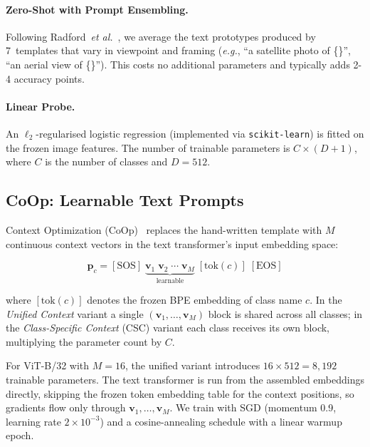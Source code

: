 \documentclass[10pt,twocolumn,letterpaper]{article}
\newcommand{\eg}{\emph{e.g.}}
\newcommand{\etal}{\emph{et al.}}
\begin{document}
\paragraph{Zero-Shot with Prompt Ensembling.}
Following Radford~\etal~\cite{radford2021learning}, we average the text prototypes produced by 7~templates that vary in viewpoint and framing (\eg, ``a satellite photo of \{\}'', ``an aerial view of \{\}''). This costs no additional parameters and typically adds 2-4 accuracy points.

\paragraph{Linear Probe.}
An $\ell_2$-regularised logistic regression (implemented via \texttt{scikit-learn}) is fitted on the frozen image features.  The number of trainable parameters is $C \times (D + 1)$, where $C$ is the number of classes and $D = 512$.


\subsection{CoOp: Learnable Text Prompts}\label{sec:coop}

Context Optimization (CoOp)~\cite{zhou2022learning} replaces the hand-written template with $M$ continuous context vectors in the text transformer's input embedding space:

\begin{equation}\label{eq:coop}
  \mathbf{p}_c = [\mathrm{SOS}]\;
  \underbrace{\mathbf{v}_1\;\mathbf{v}_2\;\cdots\;\mathbf{v}_M}_{\text{learnable}}
  \;[\mathrm{tok}(c)]\;[\mathrm{EOS}]
\end{equation}

where $[\mathrm{tok}(c)]$ denotes the frozen BPE embedding of class name $c$. In the \emph{Unified Context} variant a single $(\mathbf{v}_1, \ldots, \mathbf{v}_M)$ block is shared across all classes; in the \emph{Class-Specific Context} (CSC) variant each class receives its own block, multiplying the parameter count by $C$.

For ViT-B/32 with $M = 16$, the unified variant introduces $16 \times 512 = 8{,}192$ trainable parameters. The text transformer is run from the assembled embeddings directly, skipping the frozen token embedding table for the context positions, so gradients flow only through $\mathbf{v}_1, \ldots, \mathbf{v}_M$.  We train with SGD (momentum 0.9,
learning rate $2 \times 10^{-3}$) and a cosine-annealing schedule with a linear warmup epoch.
\end{document}
